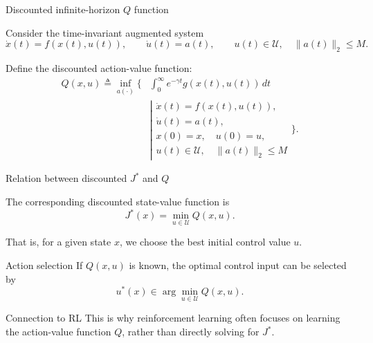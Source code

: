 \documentclass[aspectratio=169]{beamer}
\begin{document}
\begin{frame}{Discounted infinite-horizon \(Q\) function}

Consider the time-invariant augmented system
\[
\dot{x}(t)=f(x(t),u(t)),
\qquad
\dot{u}(t)=a(t),
\qquad
u(t)\in\mathcal U,\quad \|a(t)\|_2\le M.
\]

\vspace{0.15cm}

Define the discounted action-value function:
\[
\begin{aligned}
Q(x,u)
\triangleq
\inf_{a(\cdot)}
\Bigg\{
&\int_0^\infty
e^{-\gamma t}g(x(t),u(t))\,dt
\\
&\left|
\begin{array}{l}
\dot{x}(t)=f(x(t),u(t)),\\
\dot{u}(t)=a(t),\\
x(0)=x,\quad u(0)=u,\\
u(t)\in\mathcal U,\quad \|a(t)\|_2\le M
\end{array}
\right.
\Bigg\}.
\end{aligned}
\]

\vspace{0.1cm}



\end{frame}


\begin{frame}{Relation between discounted \(J^*\) and \(Q\)}

The corresponding discounted state-value function is
\[
J^*(x)
=
\min_{u\in\mathcal U}Q(x,u).
\]

\vspace{0.3cm}

That is, for a given state \(x\), we choose the best initial control value \(u\).

\vspace{0.25cm}

\begin{block}{Action selection}
\small
If \(Q(x,u)\) is known, the optimal control input can be selected by
\[
u^*(x)
\in
\arg\min_{u\in\mathcal U}Q(x,u).
\]
\end{block}

\vspace{0.15cm}

\begin{alertblock}{Connection to RL}
\small
This is why reinforcement learning often focuses on learning the action-value function \(Q\), rather than directly solving for \(J^*\).
\end{alertblock}

\end{frame}
\end{document}
